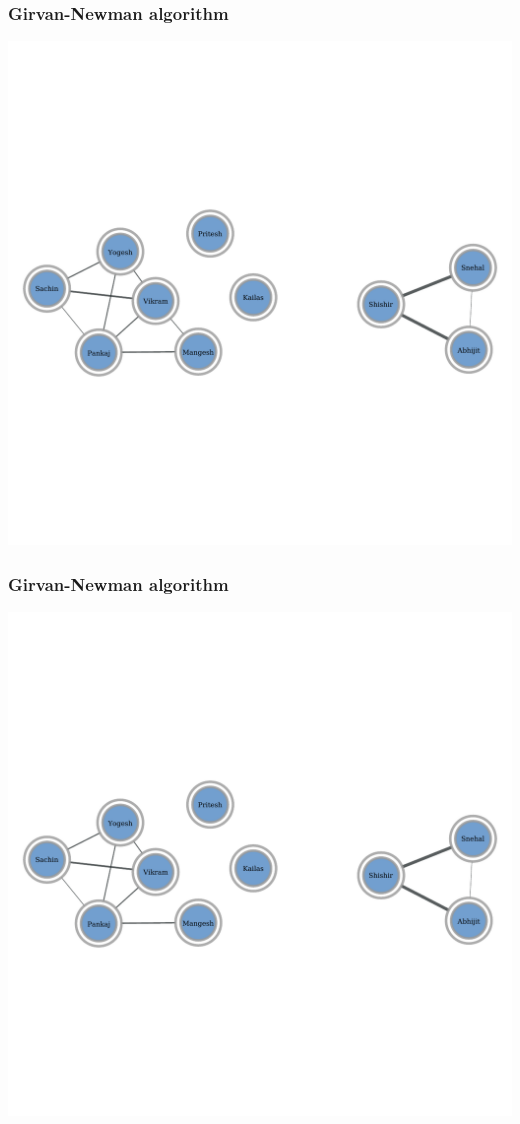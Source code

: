 \documentclass{beamer}
\begin{document}
\begin{frame}
    \frametitle{Girvan-Newman algorithm}
    \centering
    \includegraphics[width=0.8\columnwidth]{gn6.pdf}
\end{frame}
\begin{frame}
    \frametitle{Girvan-Newman algorithm}
    \centering
    \includegraphics[width=0.8\columnwidth]{gn7.pdf}
\end{frame}
\end{document}
